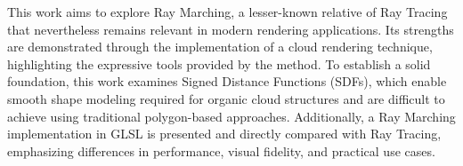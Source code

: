 This work aims to explore Ray Marching, a lesser-known relative of Ray Tracing that nevertheless remains relevant in modern rendering applications. Its strengths are demonstrated through the implementation of a cloud rendering technique, highlighting the expressive tools provided by the method. To establish a solid foundation, this work examines Signed Distance Functions (SDFs), which enable smooth shape modeling required for organic cloud structures and are difficult to achieve using traditional polygon-based approaches. Additionally, a Ray Marching implementation in GLSL is presented and directly compared with Ray Tracing, emphasizing differences in performance, visual fidelity, and practical use cases.